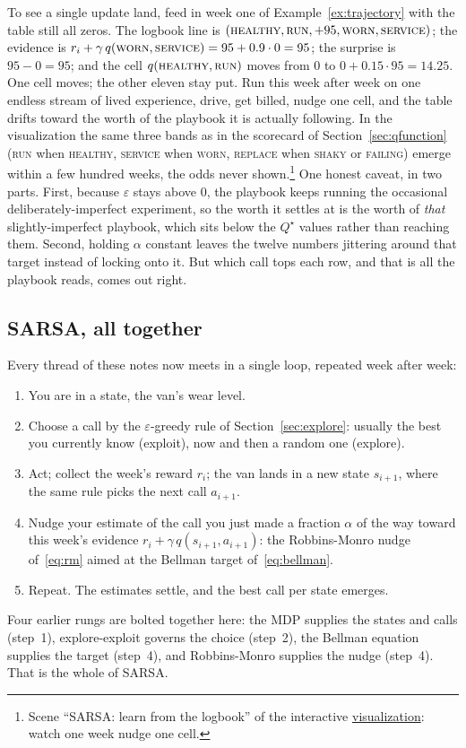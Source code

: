 \documentclass[11pt,a4paper]{article}
\theoremstyle{definition}
\theoremstyle{remark}
\numberwithin{equation}{section}
\newcommand{\sa}[1]{\textsc{#1}}   %
\newcommand{\vizhref}[1]{\href{https://eth-ainit-fs26.github.io/rl-arcade/repair-or-replace/}{#1}}
\begin{document}
To see a single update land, feed in week one of Example~\ref{ex:trajectory} with the table
still all zeros. The logbook line is $(\sa{healthy}, \sa{run}, +95, \sa{worn}, \sa{service})$;
the evidence is $r_i + \gamma\, q(\sa{worn}, \sa{service}) = 95 + 0.9 \cdot 0 = 95$; the
surprise is $95 - 0 = 95$; and the cell $q(\sa{healthy}, \sa{run})$ moves from $0$ to
$0 + 0.15 \cdot 95 = 14.25$. One cell moves; the other eleven stay put. Run this week after
week on one endless stream of lived experience, drive, get billed, nudge one cell, and the
table drifts toward the worth of the playbook it is actually following. In the visualization
the same three bands as in the scorecard of Section~\ref{sec:qfunction} (\sa{run} when
\sa{healthy}, \sa{service} when \sa{worn}, \sa{replace} when \sa{shaky} or \sa{failing}) emerge
within a few hundred weeks, the odds never shown.\footnote{Scene ``SARSA: learn from the
logbook'' of the interactive \vizhref{visualization}: watch one week nudge one cell.} One
honest caveat, in two parts. First, because $\varepsilon$ stays above $0$, the playbook keeps
running the occasional deliberately-imperfect experiment, so the worth it settles at is the
worth of \emph{that} slightly-imperfect playbook, which sits below the $Q^\star$ values rather
than reaching them. Second, holding $\alpha$ constant leaves the twelve numbers jittering
around that target instead of locking onto it. But which call tops each row, and that is all
the playbook reads, comes out right.

\subsection*{SARSA, all together}

Every thread of these notes now meets in a single loop, repeated week after week:
\begin{enumerate}
\item You are in a state, the van's wear level.
\item Choose a call by the $\varepsilon$-greedy rule of Section~\ref{sec:explore}: usually the
  best you currently know (exploit), now and then a random one (explore).
\item Act; collect the week's reward $r_i$; the van lands in a new state $s_{i+1}$, where the
  same rule picks the next call $a_{i+1}$.
\item Nudge your estimate of the call you just made a fraction $\alpha$ of the way toward this
  week's evidence $r_i + \gamma\, q(s_{i+1}, a_{i+1})$: the Robbins-Monro nudge
  of~\eqref{eq:rm} aimed at the Bellman target of~\eqref{eq:bellman}.
\item Repeat. The estimates settle, and the best call per state emerges.
\end{enumerate}
Four earlier rungs are bolted together here: the MDP supplies the states and calls (step~1),
explore-exploit governs the choice (step~2), the Bellman equation supplies the target
(step~4), and Robbins-Monro supplies the nudge (step~4). That is the whole of SARSA.
\end{document}
